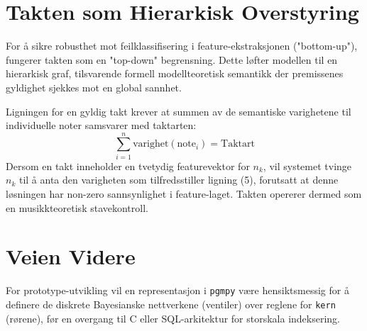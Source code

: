 \documentclass[11pt, a4paper]{article}
\begin{document}
\section{Takten som Hierarkisk Overstyring}
For å sikre robusthet mot feilklassifisering i feature-ekstraksjonen ("bottom-up"), fungerer takten som en "top-down" begrensning. Dette løfter modellen til en hierarkisk graf, tilsvarende formell modellteoretisk semantikk der premissenes gyldighet sjekkes mot en global sannhet.

Ligningen for en gyldig takt krever at summen av de semantiske varighetene til individuelle noter samsvarer med taktarten:
\begin{equation}
    \sum_{i=1}^{n} \text{varighet}(\text{note}_i) = \text{Taktart}
\end{equation}
Dersom en takt inneholder en tvetydig featurevektor for $n_k$, vil systemet tvinge $n_k$ til å anta den varigheten som tilfredsstiller ligning (5), forutsatt at denne løsningen har non-zero sannsynlighet i feature-laget. Takten opererer dermed som en musikkteoretisk stavekontroll.

\section{Veien Videre}
For prototype-utvikling vil en representasjon i \texttt{pgmpy} være hensiktsmessig for å definere de diskrete Bayesianske nettverkene (ventiler) over reglene for \texttt{kern} (rørene), før en overgang til C eller SQL-arkitektur for storskala indeksering.
\end{document}
